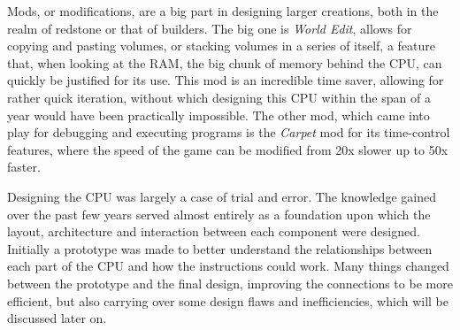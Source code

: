 Mods, or modifications, are a big part in designing larger creations, both in the realm of redstone or that of builders. The big one is \textit{World Edit}, allows for copying and pasting volumes, or stacking volumes in a series of itself, a feature that, when looking at the RAM, the big chunk of memory behind the CPU, can quickly be justified for its use. This mod is an incredible time saver, allowing for rather quick iteration, without which designing this CPU within the span of a year would have been practically impossible. The other mod, which came into play for debugging and executing programs is the \textit{Carpet} mod for its time-control features, where the speed of the game can be modified from 20x slower up to 50x faster.

Designing the CPU was largely a case of trial and error. The knowledge gained over the past few years served almost entirely as a foundation upon which the layout, architecture and interaction between each component were designed. Initially a prototype was made to better understand the relationships between each part of the CPU and how the instructions could work. Many things changed between the prototype and the final design, improving the connections to be more efficient, but also carrying over some design flaws and inefficiencies, which will be discussed later on.
